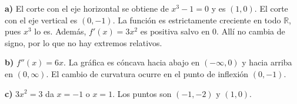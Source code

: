 \textbf{a)} El corte con el eje horizontal se obtiene de $x^3-1=0$ y es $(1,0)$. El corte con el eje vertical es $(0,-1)$. La función es estrictamente creciente en todo $\mathbb R$, pues $x^3$ lo es. Además, $f'(x)=3x^2$ es positiva salvo en $0$. Allí no cambia de signo, por lo que no hay extremos relativos.

\textbf{b)} $f''(x)=6x$. La gráfica es cóncava hacia abajo en $(-\infty,0)$ y hacia arriba en $(0,\infty)$. El cambio de curvatura ocurre en el punto de inflexión $\boxed{(0,-1)}$.

\textbf{c)} $3x^2=3$ da $x=-1$ o $x=1$. Los puntos son $\boxed{(-1,-2)\text{ y }(1,0)}$.
